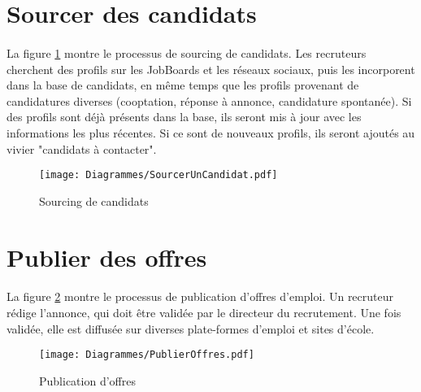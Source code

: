 \section{Sourcer des candidats}
\label{section:sourcing}
\paragraph{} La figure \ref{sourcing} montre le processus de sourcing de candidats. Les recruteurs cherchent des profils sur les JobBoards et les réseaux sociaux, puis les incorporent dans la base de candidats, en même temps que les profils provenant de candidatures diverses (cooptation, réponse à annonce, candidature spontanée). Si des profils sont déjà présents dans la base, ils seront mis à jour avec les informations les plus récentes. Si ce sont de nouveaux profils, ils seront ajoutés au vivier "candidats à contacter".

\begin{figure}
	\centering
	\texttt{[image: Diagrammes/SourcerUnCandidat.pdf]}
	\caption{Sourcing de candidats}
	\label{sourcing}	
\end{figure}

\section{Publier des offres}

\paragraph{} La figure \ref{publierOffres} montre le processus de publication d'offres d'emploi. Un recruteur rédige l'annonce, qui doit être validée par le directeur du recrutement. Une fois validée, elle est diffusée sur diverses plate-formes d'emploi et sites d'école.


\begin{figure}
	\centering
	\texttt{[image: Diagrammes/PublierOffres.pdf]}
	\caption{Publication d'offres}
	\label{publierOffres}	
\end{figure}



